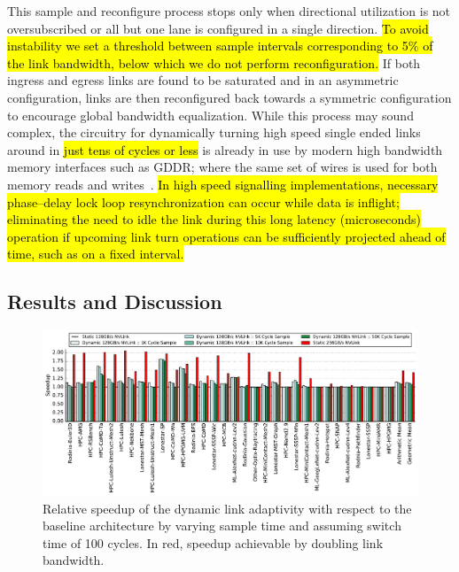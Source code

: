 This sample and 
reconfigure process stops only when directional utilization is not 
oversubscribed or all but one lane is configured in a single direction. 
\hl{To avoid instability we set a threshold between 
sample intervals corresponding to 5\% of the link bandwidth, below which we do 
not perform reconfiguration.}
If both ingress and egress links are found to be saturated and in an asymmetric 
configuration, links are then reconfigured back towards a symmetric configuration 
to encourage global bandwidth equalization. While this process may sound 
complex, the circuitry for dynamically turning high speed single ended links 
around in \hl{just tens of cycles or less} is already in use by modern high bandwidth 
memory interfaces such as GDDR; where the same set of wires is used for both memory reads 
and writes~\cite{hynixgddr51Gb}. \hl{In high speed signalling implementations,
necessary phase--delay lock loop
resynchronization can occur while data is inflight; eliminating the need to idle
the link during this long latency (microseconds) operation if upcoming link turn operations
can be sufficiently projected ahead of time, such as on a fixed interval.}

\vspace{-0.1in}
\subsection{Results and Discussion} 

\begin{figure}[tp]
	\centering
	\includegraphics[width=1.0\textwidth]{figures/plot_nvlink_sample_time.pdf}
	\caption{Relative speedup of the dynamic link adaptivity with respect to
		the baseline architecture by varying sample time and assuming switch 
		time of
		100 cycles. In red, speedup achievable by doubling link 
		bandwidth.}
	\label{fig:sampletime}
	\vspace{-.2in}
\end{figure}

